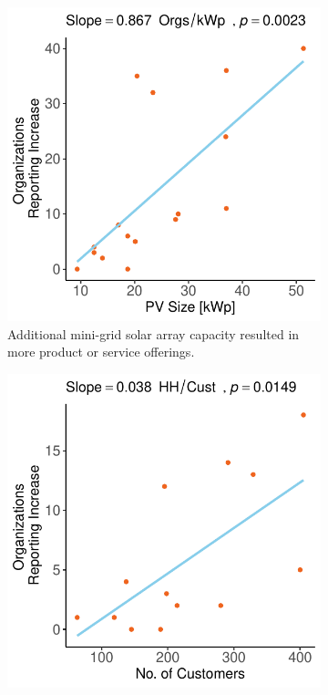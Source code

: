 \begin{figure}[th]
    \centering
    \begin{subfigure}[t]{0.48\textwidth}
        \centering
        \includegraphics[width=\textwidth]{images/ci_offering_change_regression_community.pdf}
        \caption{Additional mini-grid solar array capacity resulted in more product or service offerings.}
        \label{fig:ci_offering}
    \end{subfigure}
    \hfill
    \begin{subfigure}[t]{0.48\textwidth}
        \centering
        \includegraphics[width=\textwidth]{images/workforce_change_regression_community.pdf}

\end{subfigure}
\end{figure}
